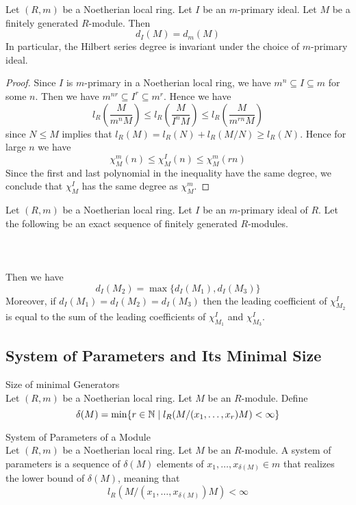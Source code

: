 \documentclass[a4paper]{article}
\begin{document}
\begin{prp}{}{} Let $(R,m)$ be a Noetherian local ring. Let $I$ be an $m$-primary ideal. Let $M$ be a finitely generated $R$-module. Then $$d_I(M)=d_m(M)$$ In particular, the Hilbert series degree is invariant under the choice of $m$-primary ideal. 
\begin{proof}
Since $I$ is $m$-primary in a Noetherian local ring, we have $m^n\subseteq I\subseteq m$ for some $n$. Then we have $m^{nr}\subseteq I^r\subseteq m^r$. Hence we have $$l_R\left(\frac{M}{m^nM}\right)\leq l_R\left(\frac{M}{I^nM}\right)\leq l_R\left(\frac{M}{m^{rn}M}\right)$$ since $N\leq M$ implies that $l_R(M)=l_R(N)+l_R(M/N)\geq l_R(N)$. Hence for large $n$ we have $$\chi_M^m(n)\leq\chi_M^I(n)\leq\chi_M^m(rn)$$ Since the first and last polynomial in the inequality have the same degree, we conclude that $\chi_M^I$ has the same degree as $\chi_M^m$. 
\end{proof}
\end{prp}

\begin{prp}{}{} Let $(R,m)$ be a Noetherian local ring. Let $I$ be an $m$-primary ideal of $R$. Let the following be an exact sequence of finitely generated $R$-modules. \\~\\
\\~\\
Then we have $$d_I(M_2)=\max\{d_I(M_1),d_I(M_3)\}$$ Moreover, if $d_I(M_1)=d_I(M_2)=d_I(M_3)$ then the leading coefficient of $\chi_{M_2}^I$ is equal to the sum of the leading coefficients of $\chi_{M_1}^I$ and $\chi_{M_3}^I$. 
\end{prp}

\subsection{System of Parameters and Its Minimal Size}
\begin{defn}{Size of minimal Generators}{}\\
Let $(R,m)$ be a Noetherian local ring. Let $M$ be an $R$-module. Define $$\delta(M)=\min\{r\in\mathbb{N}\;|\;l_R(M/(x_1,\dots,x_r)M)<\infty\}$$
\end{defn}

\begin{defn}{System of Parameters of a Module}{}\\
Let $(R,m)$ be a Noetherian local ring. Let $M$ be an $R$-module. A system of parameters is a sequence of $\delta(M)$ elements of $x_1,\dots,x_{\delta(M)}\in m$ that realizes the lower bound of $\delta(M)$, meaning that $$l_R(M/(x_1,\dots,x_{\delta(M)})M)<\infty$$
\end{defn}
\end{document}
